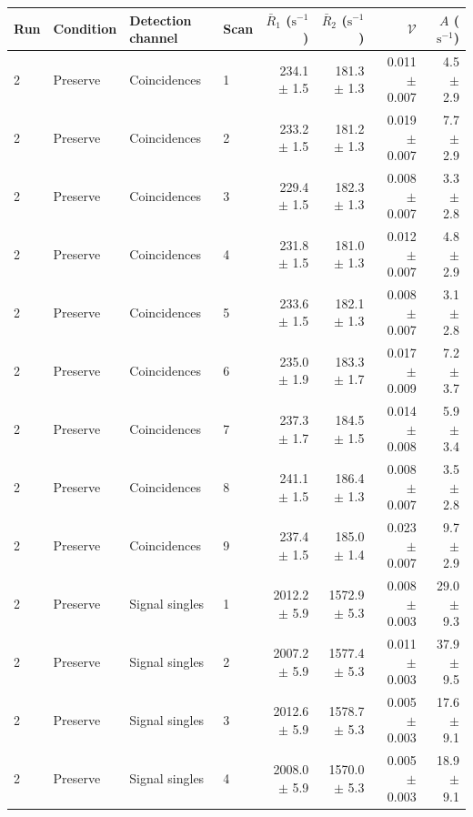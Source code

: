 \begin{tabular}{llllrrrr}
\toprule
Run & Condition & Detection channel & Scan & $\bar R_1$ ($\mathrm{s}^{-1}$) & $\bar R_2$ ($\mathrm{s}^{-1}$) & $\mathcal{V}$ & $A$ ($\mathrm{s}^{-1}$) \\
\midrule
2 & Preserve & Coincidences & 1 & 234.1 \ensuremath{\pm} 1.5 & 181.3 \ensuremath{\pm} 1.3 & 0.011 \ensuremath{\pm} 0.007 & 4.5 \ensuremath{\pm} 2.9 \\
2 & Preserve & Coincidences & 2 & 233.2 \ensuremath{\pm} 1.5 & 181.2 \ensuremath{\pm} 1.3 & 0.019 \ensuremath{\pm} 0.007 & 7.7 \ensuremath{\pm} 2.9 \\
2 & Preserve & Coincidences & 3 & 229.4 \ensuremath{\pm} 1.5 & 182.3 \ensuremath{\pm} 1.3 & 0.008 \ensuremath{\pm} 0.007 & 3.3 \ensuremath{\pm} 2.8 \\
2 & Preserve & Coincidences & 4 & 231.8 \ensuremath{\pm} 1.5 & 181.0 \ensuremath{\pm} 1.3 & 0.012 \ensuremath{\pm} 0.007 & 4.8 \ensuremath{\pm} 2.9 \\
2 & Preserve & Coincidences & 5 & 233.6 \ensuremath{\pm} 1.5 & 182.1 \ensuremath{\pm} 1.3 & 0.008 \ensuremath{\pm} 0.007 & 3.1 \ensuremath{\pm} 2.8 \\
2 & Preserve & Coincidences & 6 & 235.0 \ensuremath{\pm} 1.9 & 183.3 \ensuremath{\pm} 1.7 & 0.017 \ensuremath{\pm} 0.009 & 7.2 \ensuremath{\pm} 3.7 \\
2 & Preserve & Coincidences & 7 & 237.3 \ensuremath{\pm} 1.7 & 184.5 \ensuremath{\pm} 1.5 & 0.014 \ensuremath{\pm} 0.008 & 5.9 \ensuremath{\pm} 3.4 \\
2 & Preserve & Coincidences & 8 & 241.1 \ensuremath{\pm} 1.5 & 186.4 \ensuremath{\pm} 1.3 & 0.008 \ensuremath{\pm} 0.007 & 3.5 \ensuremath{\pm} 2.8 \\
2 & Preserve & Coincidences & 9 & 237.4 \ensuremath{\pm} 1.5 & 185.0 \ensuremath{\pm} 1.4 & 0.023 \ensuremath{\pm} 0.007 & 9.7 \ensuremath{\pm} 2.9 \\
\midrule
2 & Preserve & Signal singles & 1 & 2012.2 \ensuremath{\pm} 5.9 & 1572.9 \ensuremath{\pm} 5.3 & 0.008 \ensuremath{\pm} 0.003 & 29.0 \ensuremath{\pm} 9.3 \\
2 & Preserve & Signal singles & 2 & 2007.2 \ensuremath{\pm} 5.9 & 1577.4 \ensuremath{\pm} 5.3 & 0.011 \ensuremath{\pm} 0.003 & 37.9 \ensuremath{\pm} 9.5 \\
2 & Preserve & Signal singles & 3 & 2012.6 \ensuremath{\pm} 5.9 & 1578.7 \ensuremath{\pm} 5.3 & 0.005 \ensuremath{\pm} 0.003 & 17.6 \ensuremath{\pm} 9.1 \\
2 & Preserve & Signal singles & 4 & 2008.0 \ensuremath{\pm} 5.9 & 1570.0 \ensuremath{\pm} 5.3 & 0.005 \ensuremath{\pm} 0.003 & 18.9 \ensuremath{\pm} 9.1 \\

\end{tabular}
